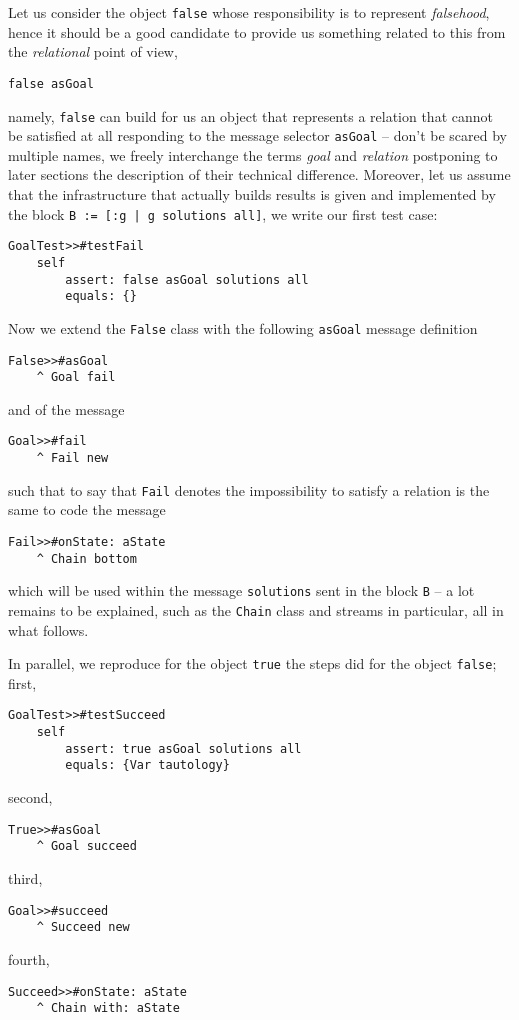 \documentclass[a4paper,12pt]{article}
\begin{document}
Let us consider the object \Verb|false| whose responsibility is to represent
\textit{falsehood}, hence it should be a good candidate to provide us something
related to this from the \textit{relational} point of view,
\begin{verbatim}
false asGoal
\end{verbatim}
namely, \Verb|false| can build for us an object that represents a relation that
cannot be satisfied at all responding to the message selector \Verb|asGoal| --
don't be scared by multiple names, we freely interchange the terms
\textit{goal} and \textit{relation} postponing to later sections the
description of their technical difference. Moreover, let us 
assume that the infrastructure that actually builds results is given and implemented
by the block \texttt{B := [:g | g solutions all]}, we write our first test case:
\begin{verbatim}
GoalTest>>#testFail
    self 
        assert: false asGoal solutions all 
        equals: {}
\end{verbatim}
Now we extend the \Verb|False| class with the following \Verb|asGoal| message
definition
\begin{verbatim}
False>>#asGoal
    ^ Goal fail
\end{verbatim}
and of the message
\begin{verbatim}
Goal>>#fail
    ^ Fail new
\end{verbatim}
such that to say that \verb|Fail| denotes the impossibility to satisfy a relation
is the same to code the message
\begin{verbatim}
Fail>>#onState: aState 
    ^ Chain bottom
\end{verbatim}
which will be used within the message \Verb|solutions| sent in the block
\Verb|B| -- a lot remains to be explained, such as the \Verb|Chain| class and
streams in particular, all in what follows.

In parallel, we reproduce for the object \Verb|true| the steps did for
the object \Verb|false|; first,
\begin{verbatim}
GoalTest>>#testSucceed
    self 
        assert: true asGoal solutions all 
        equals: {Var tautology}
\end{verbatim}
second,
\begin{verbatim}
True>>#asGoal
    ^ Goal succeed
\end{verbatim}
third,
\begin{verbatim}
Goal>>#succeed
    ^ Succeed new
\end{verbatim}
fourth,
\begin{verbatim}
Succeed>>#onState: aState 
    ^ Chain with: aState
\end{verbatim}
\end{document}
